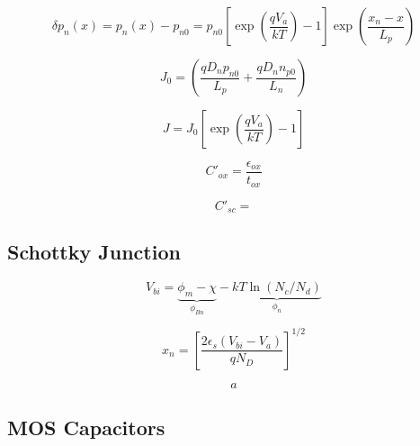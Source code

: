 \documentclass{infosheet}
\begin{document}
\begin{displaymath}
  \delta p_n(x) = p_n(x) - p_{n0} = p_{n0}\left[\exp\left(\frac{qV_a}{kT}\right)-1\right]\exp\left(\frac{x_n-x}{L_p}\right)
\end{displaymath}

\begin{displaymath}
  J_0 = \left(\frac{qD_np_{n0}}{L_p}+\frac{qD_nn_{p0}}{L_n}\right)
\end{displaymath}

\begin{displaymath}
  J = J_0\left[\exp\left(\frac{qV_a}{kT}\right)-1\right]
\end{displaymath}

\begin{displaymath}
  C'_{ox} = \frac{\epsilon_{ox}}{t_{ox}}
\end{displaymath}

\begin{displaymath}
  C'_{sc} =
\end{displaymath}

\subsection{Schottky Junction}

\begin{displaymath}
  V_{bi} = \underbrace{\phi_m - \chi}_{\phi_{Bn}} - \underbrace{kT\ln(N_c/N_d)}_{\phi_n}
\end{displaymath}

\begin{displaymath}
  x_n = \left[\frac{2\epsilon_s(V_{bi} - V_a)}{qN_D}\right]^{1/2}
\end{displaymath}

\begin{displaymath}
  a
\end{displaymath}

\subsection{MOS Capacitors}

\lipsum[1-4]
\end{document}
